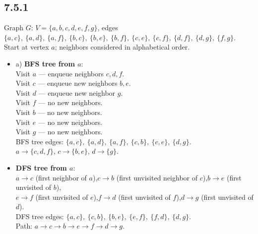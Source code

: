 \documentclass{article}
\begin{document}
\subsection*{7.5.1}
Graph $G$: $V = \{a,b,c,d,e,f,g\}$, edges $\{a,c\},\ \{a,d\},\ \{a,f\},\ \{b,c\},\ \{b,e\},\ \{b,f\},\ \{c,e\},\ \{c,f\},\ \{d,f\},\ \{d,g\},\ \{f,g\}$.\\
Start at vertex $a$; neighbors considered in alphabetical order.
\begin{itemize}
    \item a) \textbf{BFS tree from $a$}:\\
    Visit $a$ --- enqueue neighbors $c,d,f$.\\
    Visit $c$ --- enqueue new neighbors $b,e$.\\
    Visit $d$ --- enqueue new neighbor $g$.\\
    Visit $f$ --- no new neighbors.\\
    Visit $b$ --- no new neighbors.\\
    Visit $e$ --- no new neighbors.\\
    Visit $g$ --- no new neighbors.\\[4pt]
    BFS tree edges: $\{a,c\},\ \{a,d\},\ \{a,f\},\ \{c,b\},\ \{c,e\},\ \{d,g\}$.\\
    $a \to \{c,d,f\}$, $c \to \{b,e\}$, $d \to \{g\}$.

    \item[]\textbf{DFS tree from $a$}:\\
    $a \to c$ (first neighbor of $a$),\quad $c \to b$ (first unvisited neighbor of $c$),\quad $b \to e$ (first unvisited of $b$),\\
    $e \to f$ (first unvisited of $e$),\quad $f \to d$ (first unvisited of $f$),\quad $d \to g$ (first unvisited of $d$).\\[4pt]
    DFS tree edges: $\{a,c\},\ \{c,b\},\ \{b,e\},\ \{e,f\},\ \{f,d\},\ \{d,g\}$.\\
    Path: $a \to c \to b \to e \to f \to d \to g$.
\end{itemize}
\end{document}
